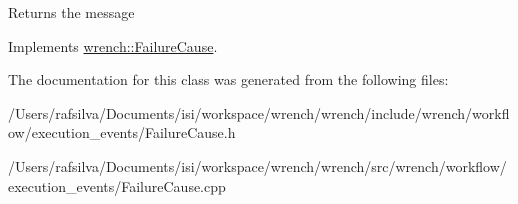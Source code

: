 \begin{DoxyReturn}{Returns}
the message 
\end{DoxyReturn}


Implements \hyperlink{classwrench_1_1_failure_cause_afbad248ebe902409f2cd4f1d6f2b867d}{wrench\+::\+Failure\+Cause}.



The documentation for this class was generated from the following files\+:\begin{DoxyCompactItemize}
\item 
/\+Users/rafsilva/\+Documents/isi/workspace/wrench/wrench/include/wrench/workflow/execution\+\_\+events/Failure\+Cause.\+h\item 
/\+Users/rafsilva/\+Documents/isi/workspace/wrench/wrench/src/wrench/workflow/execution\+\_\+events/Failure\+Cause.\+cpp\end{DoxyCompactItemize}
